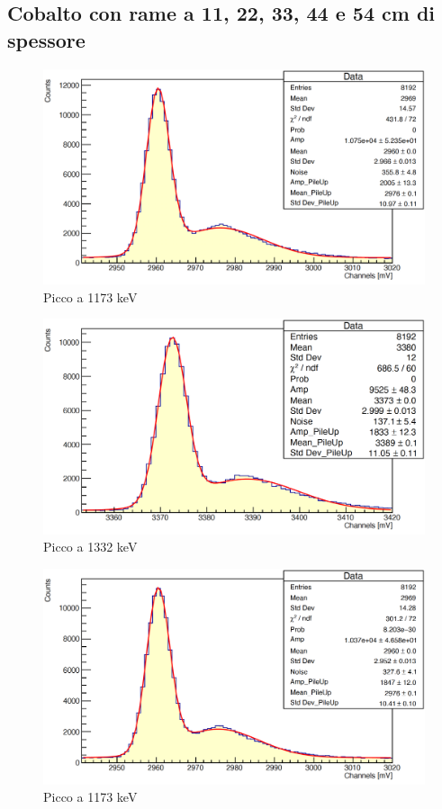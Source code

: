 \documentclass[a4paper,10pt]{article}
\begin{document}
\subsection{Cobalto con rame a 11, 22, 33, 44 e 54 cm di spessore}
\begin{figure}[H]
    \centering
    \includegraphics[scale=0.45]{appendice/spettri/CoCu1_11}
    \caption{Picco a 1173 keV}
\end{figure}
\begin{figure}[H]
    \centering
    \includegraphics[scale=0.45]{appendice/spettri/CoCu2_11}
    \caption{Picco a 1332 keV}
\end{figure}
\begin{figure}[H]
    \centering
    \includegraphics[scale=0.45]{appendice/spettri/CoCu1_22}
    \caption{Picco a 1173 keV}
\end{figure}
\end{document}
